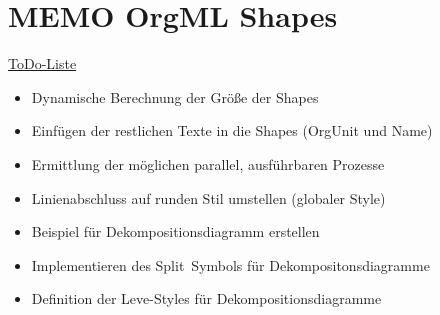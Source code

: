 \documentclass[a4paper]{article}
\begin{document}
\section*{MEMO OrgML Shapes}
\underline{ToDo-Liste}
\begin{itemize}
	\item {Dynamische Berechnung der Größe der Shapes}
	\item {Einfügen der restlichen Texte in die Shapes (OrgUnit und Name)}
	\item {Ermittlung der möglichen parallel, ausführbaren Prozesse}
	\item {Linienabschluss auf runden Stil umstellen (globaler Style)}
	\item {Beispiel für Dekompositionsdiagramm erstellen}
	\item {Implementieren des \glqq Split\grqq \ Symbols für Dekompositonsdiagramme}
	\item {Definition der Leve-Styles für Dekompositionsdiagramme}
\end{itemize}
\end{document}
